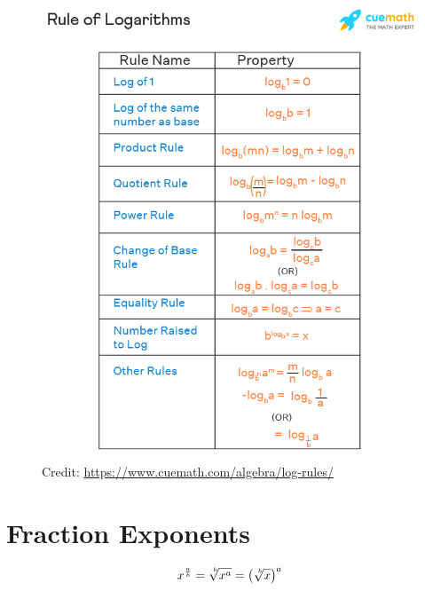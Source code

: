 \documentclass[12pt]{article}
\begin{document}
\begin{figure}[H]
	\centering
	\includegraphics[scale=.52]{logrules.png}
	\caption{Credit: \url{https://www.cuemath.com/algebra/log-rules/}}
\end{figure}

\section{Fraction Exponents}

\[x^{\frac{a}{b}}=\sqrt[\leftroot{-2}\uproot{2}b]{x^a}=\left(\sqrt[\leftroot{-2}\uproot{2}b]{x}\right)^a\]
\end{document}
